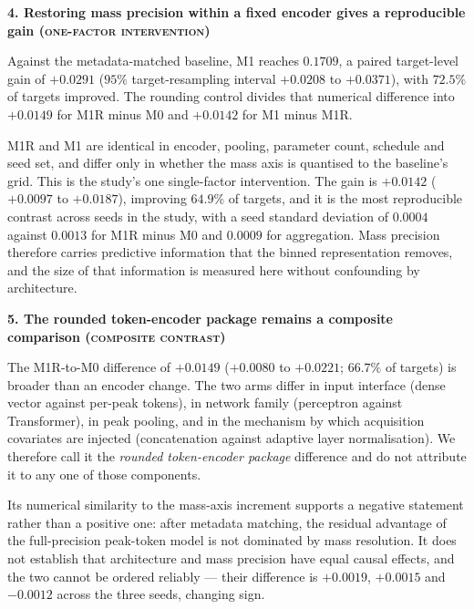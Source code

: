 \documentclass[11pt]{article}
\makeatletter
\newcommand{\hdlab}[2]{\def\@currentlabel{#1}\label{#2}}
\newcommand{\hd}[1]{\medskip\par\noindent\textbf{#1}\par\nobreak\vspace{2pt}\noindent\ignorespaces}
\newcommand{\onefactor}{{\normalfont\scshape one-factor intervention}}
\newcommand{\composite}{{\normalfont\scshape composite contrast}}
\makeatother
\begin{document}
\hd{4. Restoring mass precision within a fixed encoder gives a reproducible gain (\onefactor)}
\hdlab{4}{sec:massaxis}
Against the metadata-matched baseline, M1 reaches $0.1709$, a paired target-level gain of $+0.0291$ ($95\%$ target-resampling interval $+0.0208$ to $+0.0371$), with $72.5\%$ of targets improved. The rounding control divides that numerical difference into $+0.0149$ for M1R minus M0 and $+0.0142$ for M1 minus M1R.

M1R and M1 are identical in encoder, pooling, parameter count, schedule and seed set, and differ only in whether the mass axis is quantised to the baseline's grid. This is the study's one single-factor intervention. The gain is $+0.0142$ ($+0.0097$ to $+0.0187$), improving $64.9\%$ of targets, and it is the most reproducible contrast across seeds in the study, with a seed standard deviation of $0.0004$ against $0.0013$ for M1R minus M0 and $0.0009$ for aggregation. Mass precision therefore carries predictive information that the binned representation removes, and the size of that information is measured here without confounding by architecture.

\hd{5. The rounded token-encoder package remains a composite comparison (\composite)}
The M1R-to-M0 difference of $+0.0149$ ($+0.0080$ to $+0.0221$; $66.7\%$ of targets) is broader than an encoder change. The two arms differ in input interface (dense vector against per-peak tokens), in network family (perceptron against Transformer), in peak pooling, and in the mechanism by which acquisition covariates are injected (concatenation against adaptive layer normalisation). We therefore call it the \emph{rounded token-encoder package} difference and do not attribute it to any one of those components.

Its numerical similarity to the mass-axis increment supports a negative statement rather than a positive one: after metadata matching, the residual advantage of the full-precision peak-token model is not dominated by mass resolution. It does not establish that architecture and mass precision have equal causal effects, and the two cannot be ordered reliably --- their difference is $+0.0019$, $+0.0015$ and $-0.0012$ across the three seeds, changing sign.
\end{document}

